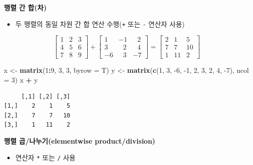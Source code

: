\documentclass[
  11pt,
]{krantz}
\newenvironment{Shaded}{\begin{snugshade}}{\end{snugshade}}
\newcommand{\DataTypeTok}[1]{\textcolor[rgb]{0.27,0.27,0.27}{#1}}
\newcommand{\DecValTok}[1]{\textcolor[rgb]{0.06,0.06,0.06}{#1}}
\newcommand{\KeywordTok}[1]{\textcolor[rgb]{0.27,0.27,0.27}{\textbf{#1}}}
\newcommand{\NormalTok}[1]{#1}
\newcommand{\OperatorTok}[1]{\textcolor[rgb]{0.43,0.43,0.43}{\textbf{#1}}}
\newcommand{\StringTok}[1]{\textcolor[rgb]{0.5,0.5,0.5}{#1}}
\providecommand{\tightlist}{%
  \setlength{\itemsep}{0pt}\setlength{\parskip}{0pt}}
\begin{document}
\textbf{행렬 간 합(차)}

\begin{itemize}
\tightlist
\item
  두 행렬의 동일 차원 간 합 연산 수행(\texttt{+} 또는 \texttt{-} 연산자 사용)
\end{itemize}

\[\begin{bmatrix}
1 & 2 & 3 \\
4 & 5 & 6 \\ 
7 & 8 & 9
\end{bmatrix} +  
\begin{bmatrix}
1 & -1 & ~~~2 \\
3 & ~~~2 & ~~~4 \\ 
-6 & ~~~3 & -7
\end{bmatrix} 
 = 
\begin{bmatrix}
2  & 1  & 5 \\
7  & 7  & 10 \\ 
1  & 11 & 2
\end{bmatrix}
\]

\footnotesize

\begin{Shaded}
\begin{Highlighting}[]
\NormalTok{x <-}\StringTok{ }\KeywordTok{matrix}\NormalTok{(}\DecValTok{1}\OperatorTok{:}\DecValTok{9}\NormalTok{, }\DecValTok{3}\NormalTok{, }\DecValTok{3}\NormalTok{, }\DataTypeTok{byrow =}\NormalTok{ T)}
\NormalTok{y <-}\StringTok{ }\KeywordTok{matrix}\NormalTok{(}\KeywordTok{c}\NormalTok{(}\DecValTok{1}\NormalTok{, }\DecValTok{3}\NormalTok{, }\DecValTok{-6}\NormalTok{, }\DecValTok{-1}\NormalTok{, }\DecValTok{2}\NormalTok{, }\DecValTok{3}\NormalTok{, }\DecValTok{2}\NormalTok{, }\DecValTok{4}\NormalTok{, }\DecValTok{-7}\NormalTok{), }\DataTypeTok{ncol =} \DecValTok{3}\NormalTok{)}
\NormalTok{x }\OperatorTok{+}\StringTok{ }\NormalTok{y}
\end{Highlighting}
\end{Shaded}

\begin{verbatim}
     [,1] [,2] [,3]
[1,]    2    1    5
[2,]    7    7   10
[3,]    1   11    2
\end{verbatim}

\normalsize

\textbf{행렬 곱/나누기(elementwise product/division)}

\begin{itemize}
\tightlist
\item
  연산자 \texttt{*} 또는 \texttt{/} 사용
\end{itemize}
\end{document}
